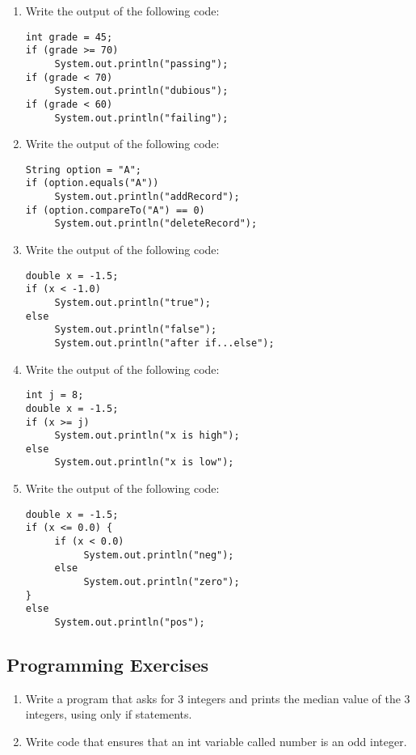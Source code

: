 \begin{enumerate}[label={\arabic{counter}\addtocounter{counter}{1}}.]
\item Write the output of the following code:
\begin{lstlisting}
int grade = 45;
if (grade >= 70)
     System.out.println("passing");
if (grade < 70)
     System.out.println("dubious");
if (grade < 60)
     System.out.println("failing");
\end{lstlisting}

\item Write the output of the following code:
\begin{lstlisting}
String option = "A";
if (option.equals("A"))
     System.out.println("addRecord");
if (option.compareTo("A") == 0)
     System.out.println("deleteRecord");
\end{lstlisting}

\item Write the output of the following code:
\begin{lstlisting}
double x = -1.5;
if (x < -1.0)
     System.out.println("true");
else
     System.out.println("false");
     System.out.println("after if...else");
\end{lstlisting}

\item Write the output of the following code:
\begin{lstlisting}
int j = 8;
double x = -1.5;
if (x >= j)
     System.out.println("x is high");
else
     System.out.println("x is low");
\end{lstlisting}

\item Write the output of the following code:
\begin{lstlisting}
double x = -1.5;
if (x <= 0.0) {
     if (x < 0.0)
          System.out.println("neg");
     else
          System.out.println("zero");
}
else
     System.out.println("pos");
\end{lstlisting}

\end{enumerate}

\subsection{Programming Exercises}

\setcounter{counter}{1}
\begin{enumerate}[label={\arabic{counter}\addtocounter{counter}{1}}.]

\item Write a program that asks for 3 integers and prints the median value of the 3 integers, using only if statements.

\item Write code that ensures that an int variable called number is an odd integer.

\end{enumerate}